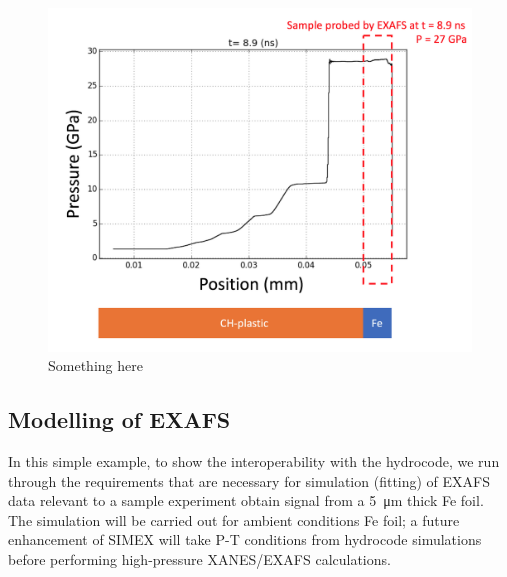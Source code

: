 \begin{figure}
  \includegraphics[width=4.822in]{figures/SIMEX-Fe-Shock.png}
  \caption{%
    Something here%
  }
  \label{fig:hydro}
\end{figure}

\subsection{Modelling of EXAFS}
In this simple example, to show the interoperability with the hydrocode,
we run through the requirements that are necessary for
simulation (fitting) of EXAFS data relevant to a sample experiment obtain signal
from a \SI{5}{\micro\metre} thick Fe foil. The simulation will be carried out for
ambient conditions Fe foil; a future enhancement of SIMEX will take P-T
conditions from hydrocode simulations before performing high-pressure
XANES/EXAFS calculations.

